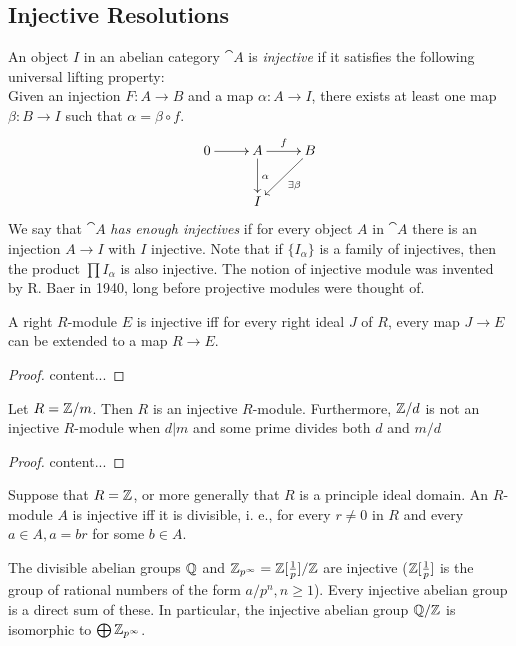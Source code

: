 \subsection{Injective Resolutions}

\begin{definition}
	An object $I$ in an abelian category $\cat{A}$ is \textit{injective} if it satisfies the following universal lifting property: \\
	Given an injection $F:A\rightarrow B$ and a map $\alpha:A\rightarrow I$, there exists at least one map $\beta:B\rightarrow I$ such that $\alpha=\beta\circ f$.
	\begin{align*}
		\xymatrix{
			0 \ar[r] &A \ar[r]^f \ar[d]^\alpha & B \ar[ld]^{\exists\beta} \\
			&I
		}
	\end{align*}
	We say that $\cat{A}$ \textit{has enough injectives} if for every object $A$ in $\cat{A}$ there is an injection $A\rightarrow I$ with $I$ injective. Note that if $\{I_\alpha\}$ is a family of injectives, then the product $\prod I_\alpha$ is also injective.
	The notion of injective module was invented by R. Baer in 1940, long before projective modules were thought of.
\end{definition}

\begin{criterion}[Baer]
	A right $R$-module $E$ is injective iff for every right ideal $J$ of $R$, every map $J\rightarrow E$ can be extended to a map $R\rightarrow E$.
\end{criterion}

\begin{proof}
	content...
\end{proof}

\begin{exercise}
	Let $R={\mathbb Z}/m$. Then $R$ is an injective $R$-module.
	Furthermore, ${\mathbb Z}/d$ is not an injective $R$-module when $d\vert m$ and some prime divides both $d$ and $m/d$
\end{exercise}

\begin{proof}
	content...
\end{proof}

\begin{corollary}
	Suppose that $R={\mathbb Z}$, or more generally that $R$ is a principle ideal domain. An $R$-module $A$ is injective iff it is divisible, i. e., for every $r\neq0$ in $R$ and every $a\in A, a=br$ for some $b\in A$.
\end{corollary}

\begin{example}
	The divisible abelian groups ${\mathbb Q}$ and ${\mathbb Z}_{p^\infty}={\mathbb Z}[\frac{1}{p}]/{\mathbb Z}$ are injective (${\mathbb Z}[\frac{1}{p}]$ is the group of rational numbers of the form $a/p^n,n\geq 1$). Every injective abelian group is a direct sum of these. In particular, the injective abelian group ${\mathbb Q}/{\mathbb Z}$ is isomorphic to $\bigoplus{\mathbb Z}_{p^\infty}$.
\end{example}